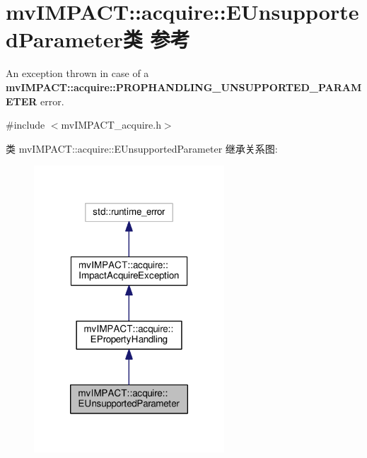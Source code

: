 \hypertarget{classmv_i_m_p_a_c_t_1_1acquire_1_1_e_unsupported_parameter}{\section{mv\+I\+M\+P\+A\+C\+T\+:\+:acquire\+:\+:E\+Unsupported\+Parameter类 参考}
\label{classmv_i_m_p_a_c_t_1_1acquire_1_1_e_unsupported_parameter}
}


An exception thrown in case of a {\bfseries mv\+I\+M\+P\+A\+C\+T\+::acquire\+::\+P\+R\+O\+P\+H\+A\+N\+D\+L\+I\+N\+G\+\_\+\+U\+N\+S\+U\+P\+P\+O\+R\+T\+E\+D\+\_\+\+P\+A\+R\+A\+M\+E\+T\+E\+R} error.  




{\ttfamily \#include $<$mv\+I\+M\+P\+A\+C\+T\+\_\+acquire.\+h$>$}



类 mv\+I\+M\+P\+A\+C\+T\+:\+:acquire\+:\+:E\+Unsupported\+Parameter 继承关系图\+:
\nopagebreak
\begin{figure}[H]
\begin{center}
\leavevmode
\includegraphics[width=202pt]{classmv_i_m_p_a_c_t_1_1acquire_1_1_e_unsupported_parameter__inherit__graph}
\end{center}
\end{figure}


